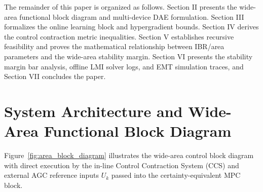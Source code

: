 \documentclass[journal]{IEEEtran}
\begin{document}
The remainder of this paper is organized as follows. Section II presents the wide-area functional block diagram and multi-device DAE formulation. Section III formalizes the online learning block and hypergradient bounds. Section IV derives the control contraction metric inequalities. Section V establishes recursive feasibility and proves the mathematical relationship between IBR/area parameters and the wide-area stability margin. Section VI presents the stability margin bar analysis, offline LMI solver logs, and EMT simulation traces, and Section VII concludes the paper.

\section{System Architecture and Wide-Area Functional Block Diagram}
Figure~\ref{fig:area_block_diagram} illustrates the wide-area control block diagram with direct execution by the in-line Control Contraction System (CCS) and external AGC reference inputs $U_k$ passed into the certainty-equivalent MPC block.
\end{document}
